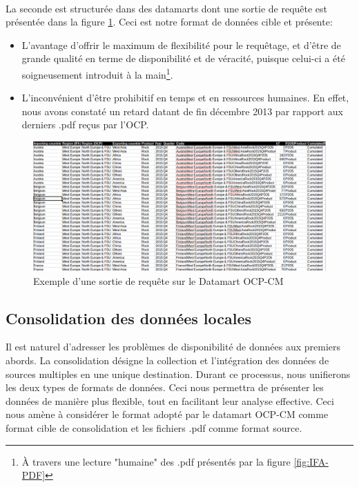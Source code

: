 		\paragraph{}
		La seconde est structurée dans des datamarts dont une sortie de requête est présentée dans la figure \ref{fig:DMOCP}.
	Ceci est notre format de données cible 
	et présente:
	\begin{itemize}
	\item L'avantage d’offrir le maximum de flexibilité pour le requêtage, et d'être de grande qualité en terme de disponibilité et de véracité, puisque celui-ci a été soigneusement introduit à la main\footnote{À travers une lecture "humaine" des .pdf présentés par la figure \ref{fig:IFA-PDF}}.
	\item L’inconvénient d'être prohibitif en temps et en ressources humaines.
	 En effet, nous avons constaté un retard datant de fin décembre 2013 par rapport aux derniers .pdf reçus par l'OCP.
	\end{itemize}
	\begin{figure}[H]
		    		\centering
	    			\includegraphics[scale=0.325]{Table}
		    		\caption{Exemple d'une sortie de requête sur le Datamart OCP-CM}
		    		\label{fig:DMOCP}
	\end{figure}
	\subsection{Consolidation des données locales}
	Il est naturel d'adresser les problèmes de disponibilité de données aux premiers abords. La consolidation désigne la collection et l'intégration des données de sources multiples en une unique destination. Durant ce processus, nous unifierons les deux types de formats de données. Ceci nous permettra de présenter les données de manière plus flexible, tout en facilitant leur analyse effective. Ceci nous amène à considérer le format adopté par le datamart OCP-CM comme format cible de consolidation et les fichiers .pdf comme format source.
